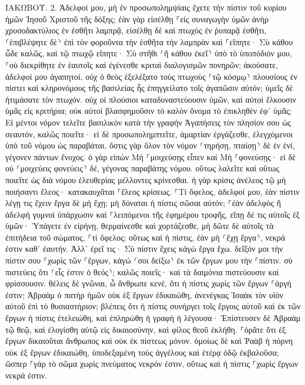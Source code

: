 \documentclass[twoside, 9pt]{extreport}
\begin{document}
ΙΑΚΩΒΟΥ.
2.
Ἀδελφοί μου, μὴ ἐν προσωπολημψίαις ἔχετε τὴν πίστιν τοῦ κυρίου ἡμῶν Ἰησοῦ Χριστοῦ τῆς δόξης; 
ἐὰν γὰρ εἰσέλθῃ ⸀εἰς συναγωγὴν ὑμῶν ἀνὴρ χρυσοδακτύλιος ἐν ἐσθῆτι λαμπρᾷ, εἰσέλθῃ δὲ καὶ πτωχὸς ἐν ῥυπαρᾷ ἐσθῆτι, 
⸂ἐπιβλέψητε δὲ⸃ ἐπὶ τὸν φοροῦντα τὴν ἐσθῆτα τὴν λαμπρὰν καὶ ⸀εἴπητε· Σὺ κάθου ὧδε καλῶς, καὶ τῷ πτωχῷ εἴπητε· Σὺ στῆθι ⸂ἢ κάθου ἐκεῖ⸃ ὑπὸ τὸ ὑποπόδιόν μου, 
⸀οὐ διεκρίθητε ἐν ἑαυτοῖς καὶ ἐγένεσθε κριταὶ διαλογισμῶν πονηρῶν; 
ἀκούσατε, ἀδελφοί μου ἀγαπητοί. οὐχ ὁ θεὸς ἐξελέξατο τοὺς πτωχοὺς ⸂τῷ κόσμῳ⸃ πλουσίους ἐν πίστει καὶ κληρονόμους τῆς βασιλείας ἧς ἐπηγγείλατο τοῖς ἀγαπῶσιν αὐτόν; 
ὑμεῖς δὲ ἠτιμάσατε τὸν πτωχόν. οὐχ οἱ πλούσιοι καταδυναστεύουσιν ὑμῶν, καὶ αὐτοὶ ἕλκουσιν ὑμᾶς εἰς κριτήρια; 
οὐκ αὐτοὶ βλασφημοῦσιν τὸ καλὸν ὄνομα τὸ ἐπικληθὲν ἐφ᾽ ὑμᾶς; 
Εἰ μέντοι νόμον τελεῖτε βασιλικὸν κατὰ τὴν γραφήν Ἀγαπήσεις τὸν πλησίον σου ὡς σεαυτόν, καλῶς ποιεῖτε· 
εἰ δὲ προσωπολημπτεῖτε, ἁμαρτίαν ἐργάζεσθε, ἐλεγχόμενοι ὑπὸ τοῦ νόμου ὡς παραβάται. 
ὅστις γὰρ ὅλον τὸν νόμον ⸂τηρήσῃ, πταίσῃ⸃ δὲ ἐν ἑνί, γέγονεν πάντων ἔνοχος. 
ὁ γὰρ εἰπών Μὴ ⸀μοιχεύσῃς εἶπεν καί Μὴ ⸀φονεύσῃς· εἰ δὲ οὐ ⸂μοιχεύεις φονεύεις⸃ δέ, γέγονας παραβάτης νόμου. 
οὕτως λαλεῖτε καὶ οὕτως ποιεῖτε ὡς διὰ νόμου ἐλευθερίας μέλλοντες κρίνεσθαι. 
ἡ γὰρ κρίσις ἀνέλεος τῷ μὴ ποιήσαντι ἔλεος· κατακαυχᾶται ⸀ἔλεος κρίσεως. 
⸀Τί ὄφελος, ἀδελφοί μου, ἐὰν πίστιν λέγῃ τις ἔχειν ἔργα δὲ μὴ ἔχῃ; μὴ δύναται ἡ πίστις σῶσαι αὐτόν; 
⸀ἐὰν ἀδελφὸς ἢ ἀδελφὴ γυμνοὶ ὑπάρχωσιν καὶ ⸀λειπόμενοι τῆς ἐφημέρου τροφῆς, 
εἴπῃ δέ τις αὐτοῖς ἐξ ὑμῶν· Ὑπάγετε ἐν εἰρήνῃ, θερμαίνεσθε καὶ χορτάζεσθε, μὴ δῶτε δὲ αὐτοῖς τὰ ἐπιτήδεια τοῦ σώματος, ⸀τί ὄφελος; 
οὕτως καὶ ἡ πίστις, ἐὰν μὴ ⸂ἔχῃ ἔργα⸃, νεκρά ἐστιν καθ᾽ ἑαυτήν. 
Ἀλλ᾽ ἐρεῖ τις· Σὺ πίστιν ἔχεις κἀγὼ ἔργα ἔχω. δεῖξόν μοι τὴν πίστιν σου ⸀χωρὶς τῶν ⸀ἔργων, κἀγώ ⸂σοι δείξω⸃ ἐκ τῶν ἔργων μου τὴν ⸀πίστιν. 
σὺ πιστεύεις ὅτι ⸂εἷς ἐστιν ὁ θεός⸃; καλῶς ποιεῖς· καὶ τὰ δαιμόνια πιστεύουσιν καὶ φρίσσουσιν. 
θέλεις δὲ γνῶναι, ὦ ἄνθρωπε κενέ, ὅτι ἡ πίστις χωρὶς τῶν ἔργων ⸀ἀργή ἐστιν; 
Ἀβραὰμ ὁ πατὴρ ἡμῶν οὐκ ἐξ ἔργων ἐδικαιώθη, ἀνενέγκας Ἰσαὰκ τὸν υἱὸν αὐτοῦ ἐπὶ τὸ θυσιαστήριον; 
βλέπεις ὅτι ἡ πίστις συνήργει τοῖς ἔργοις αὐτοῦ καὶ ἐκ τῶν ἔργων ἡ πίστις ἐτελειώθη, 
καὶ ἐπληρώθη ἡ γραφὴ ἡ λέγουσα· Ἐπίστευσεν δὲ Ἀβραὰμ τῷ θεῷ, καὶ ἐλογίσθη αὐτῷ εἰς δικαιοσύνην, καὶ φίλος θεοῦ ἐκλήθη. 
⸀ὁρᾶτε ὅτι ἐξ ἔργων δικαιοῦται ἄνθρωπος καὶ οὐκ ἐκ πίστεως μόνον. 
ὁμοίως δὲ καὶ Ῥαὰβ ἡ πόρνη οὐκ ἐξ ἔργων ἐδικαιώθη, ὑποδεξαμένη τοὺς ἀγγέλους καὶ ἑτέρᾳ ὁδῷ ἐκβαλοῦσα; 
ὥσπερ ⸀γὰρ τὸ σῶμα χωρὶς πνεύματος νεκρόν ἐστιν, οὕτως καὶ ἡ πίστις ⸀χωρὶς ἔργων νεκρά ἐστιν. 
\end{document}
